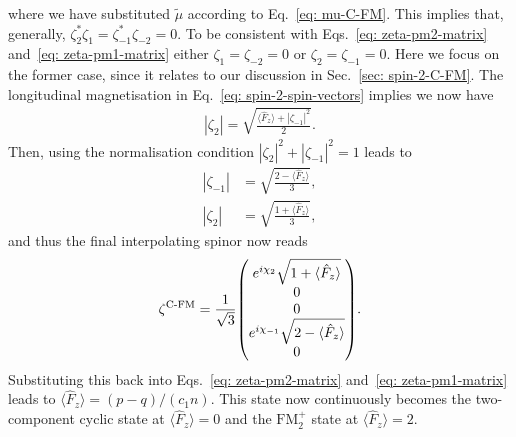 where we have substituted \(\tilde{\mu}\) according to Eq.~\eqref{eq: mu-C-FM}.
This implies that, generally, \(\zeta_2^*\zeta_1 = \zeta_{-1}^*\zeta_{-2} = 0\).
To be consistent with Eqs.~\eqref{eq: zeta-pm2-matrix}
and~\eqref{eq: zeta-pm1-matrix} either \(\zeta_1=\zeta_{-2}=0\) or
\(\zeta_2=\zeta_{-1} = 0\).
Here we focus on the former case, since it relates to our discussion in
Sec.~\ref{sec: spin-2-C-FM}.
The longitudinal magnetisation in Eq.~\eqref{eq: spin-2-spin-vectors} implies we
now have
\begin{align}
    |\zeta_2| = \sqrt{\frac{\langle\hat{F}_z\rangle + |\zeta_{-1}|^2}{2}}.    
\end{align}
Then, using the normalisation condition \(|\zeta_{2}|^2 + |\zeta_{-1}|^2 = 1\)
leads to
\begin{align}
    |\zeta_{-1}| &= \sqrt{\frac{2 - \langle\hat{F}_z\rangle}{3}}, \\
    |\zeta_2| &= \sqrt{\frac{1 + \langle\hat{F}_z\rangle}{3}},
\end{align}
and thus the final interpolating spinor now reads
\begin{align}
    \zeta^\text{C-FM} = \frac{1}{\sqrt{3}}\mqty(
        e^{i\chi_2}\sqrt{1 + \langle\hat{F}_z\rangle} \\
        0 \\
        0 \\
        e^{i\chi_{-1}}\sqrt{2 - \langle\hat{F}_z\rangle} \\
        0
    ).
\end{align}
Substituting this back into Eqs.~\eqref{eq: zeta-pm2-matrix}
and~\eqref{eq: zeta-pm1-matrix} leads to \(\langle\hat{F}_z\rangle =
(p - q)/(c_1n)\).
This state now continuously becomes the two-component cyclic state at
\(\langle\hat{F}_z\rangle = 0\) and the \(\text{FM}_2^+\) state at
\(\langle\hat{F}_z\rangle = 2\).

